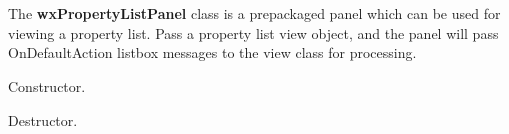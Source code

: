 \section{}\label{wxpropertylistpanel}

The {\bf wxPropertyListPanel} class is a prepackaged panel which can
be used for viewing a property list. Pass a property list view object, and the panel
will pass OnDefaultAction listbox messages to the view class for
processing.



Constructor.



Destructor.




